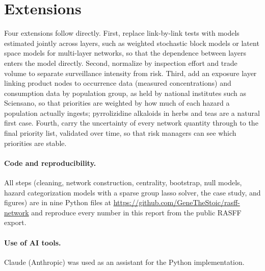 \documentclass[11pt]{article}
\begin{document}
\section{Extensions}

Four extensions follow directly. First, replace link-by-link tests with models estimated jointly across layers, such as weighted stochastic block models or latent space models for multi-layer networks, so that the dependence between layers enters the model directly. Second, normalize by inspection effort and trade volume to separate surveillance intensity from risk. Third, add an exposure layer linking product nodes to occurrence data (measured concentrations) and consumption data by population group, as held by national institutes such as Sciensano, so that priorities are weighted by how much of each hazard a population actually ingests; pyrrolizidine alkaloids in herbs and teas are a natural first case. Fourth, carry the uncertainty of every network quantity through to the final priority list, validated over time, so that risk managers can see which priorities are stable.

\paragraph{Code and reproducibility.} All steps (cleaning, network construction, centrality, bootstrap, null models, hazard categorization models with a sparse group lasso solver, the case study, and figures) are in nine Python files at \url{https://github.com/GeneTheStoic/rasff-network} and reproduce every number in this report from the public RASFF export.

\paragraph{Use of AI tools.} Claude (Anthropic) was used as an assistant for the Python implementation.
\end{document}
